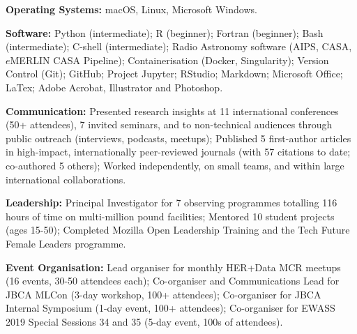  \vspace{-8pt}
\begin{cvpubs}
  \cvpub
    {
      \begin{cvlist}
        \item{\textbf{Operating Systems:} macOS, Linux, Microsoft Windows.}
        \item {\textbf{Software:} Python (intermediate); R (beginner); Fortran (beginner); Bash (intermediate); C-shell (intermediate); Radio Astronomy software (AIPS, CASA, $e$MERLIN CASA Pipeline); Containerisation (Docker, Singularity); Version Control (Git); GitHub; Project Jupyter; RStudio; Markdown; Microsoft Office; LaTex; Adobe Acrobat, Illustrator and Photoshop.}
        \item {\textbf{Communication:} Presented research insights at 11 international conferences (50+ attendees), 7 invited seminars, and to non-technical audiences through public outreach (interviews, podcasts, meetups); Published 5 first-author articles in high-impact, internationally peer-reviewed journals (with 57 citations to date; co-authored 5 others); Worked independently, on small teams, and within large international collaborations.}
        \item {\textbf{Leadership:} Principal Investigator for 7 observing programmes totalling 116 hours of time on multi-million pound facilities; Mentored 10 student projects (ages 15-50); Completed Mozilla Open Leadership Training and the Tech Future Female Leaders programme.}
        \item {\textbf{Event Organisation:} Lead organiser for monthly HER+Data MCR meetups (16 events, 30-50 attendees each); Co-organiser and Communications Lead for JBCA MLCon (3-day workshop, 100+ attendees); Co-organiser for JBCA Internal Symposium (1-day event, 100+ attendees); Co-organiser for EWASS 2019 Special Sessions 34 and 35 (5-day event, 100s of attendees).}
      \end{cvlist}
    }
\end{cvpubs}